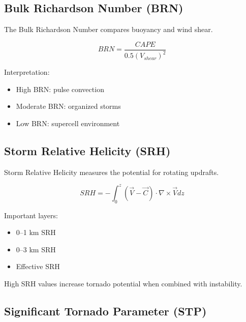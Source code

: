
\subsection{Bulk Richardson Number (BRN)}

The Bulk Richardson Number compares buoyancy and wind shear.

\[
BRN=
\frac{CAPE}
{0.5(V_{shear})^2}
\]

Interpretation:

\begin{itemize}

\item High BRN: pulse convection

\item Moderate BRN: organized storms

\item Low BRN: supercell environment

\end{itemize}


\subsection{Storm Relative Helicity (SRH)}

Storm Relative Helicity measures the potential for rotating updrafts.

\[
SRH=
-\int_{0}^{z}
(\vec{V}-\vec{C})
\cdot
\nabla\times\vec{V}
dz
\]

Important layers:

\begin{itemize}

\item 0--1 km SRH

\item 0--3 km SRH

\item Effective SRH

\end{itemize}

High SRH values increase tornado potential when combined with
instability.


\subsection{Significant Tornado Parameter (STP)}

